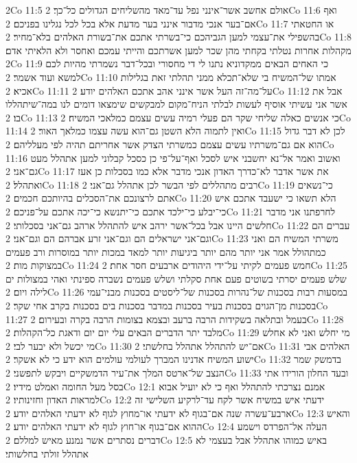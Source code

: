 2Co 11:5  אולם אחשב אשר־אינני נפל עד־מאד מהשליחים הגדולים כל־כך׃
2Co 11:6  ואף אם־בער אנכי מדבור אינני בער מדעת אלא בכל לכל נגלינו בפניכם׃
2Co 11:7  או החטאתי בהשפילי את־עצמי למען הגביהכם כי־בשרתי אתכם את־בשורת האלהים בלא־מחיר׃
2Co 11:8  מקהלות אחרות נטלתי בקחתי מהן שכר למען אשרתכם והייתי עמכם ואחסר ולא הלאיתי אדם׃
2Co 11:9  כי האחים הבאים ממקדוניא נתנו לי די מחסורי ובכל־דבר נשמרתי מהיות לכם למשא ועוד אשמר׃
2Co 11:10  אמתו של־המשיח בי שלא־תכלא ממני תהלתי זאת בגלילות אכיא׃
2Co 11:11  על־מה־זה העל אשר אינני אהב אתכם האלהים יודע׃
2Co 11:12  אבל את אשר אני עשיתי אוסיף לעשות לבלתי הניח־מקום למבקשים שימצאו דומים לנו במה־שיתהללו בו׃
2Co 11:13  כי אנשים כאלה שליחי שקר הם פעלי רמיה עשים עצמם כמלאכי המשיח׃
2Co 11:14  ואין לתמוה הלא השטן גם־הוא עשה עצמו כמלאך האור׃
2Co 11:15  לכן לא דבר גדול הוא אם גם־משרתיו עשים עצמם כמשרתי הצדק אשר אחריתם תהיה לפי מעלליהם׃
2Co 11:16  ואשוב ואמר אל־נא יחשבני איש לסכל ואף־על־פי כן כסכל קבלוני למען אתהלל מעט גם־אני׃
2Co 11:17  את אשר אדבר לא־כדרך האדון אנכי מדבר אלא כמו בסכלות כן אעז ואתהלל׃
2Co 11:18  רבים מתהללים לפי הבשר לכן אתהלל גם־אני׃
2Co 11:19  כי־נשאים אתם לרצונכם את־הסכלים בהיותכם חכמים׃
2Co 11:20  הלא תשאו כי ישעבד אתכם איש כי־יבלע כי־ילכד אתכם כי־יתנשא כי־יכה אתכם על־פניכם׃
2Co 11:21  לחרפתנו אני מדבר חלשים היינו אבל בכל־אשר ירהב איש להתהלל ארהב גם־אני בסכלותי׃
2Co 11:22  עברים הם וגם־אני ישראלים הם וגם־אני זרע אברהם הם וגם־אני׃
2Co 11:23  משרתי המשיח הם ואני כמתהולל אמר אני יותר מהם יותר ביגיעות יותר למאד במכות יותר במוסרות ורב פעמים במצוקות מות׃
2Co 11:24  חמש פעמים לקיתי על־ידי היהודים ארבעים חסר אחת׃
2Co 11:25  שלש פעמים יסרתי בשוטים פעם אחת סקלתי ושלש פעמים נשברה ספינתי ואהי במצולות ים לילה ויום׃
2Co 11:26  במסעות רבות בסכנות של־נהרות בסכנות של־ליסטים בסכנות מבני־עמי בסכנות מן־הגוים בסכנות בעיר בסכנות במדבר בסכנות בים בסכנות בקרב אחי שקר׃
2Co 11:27  בעמל ובתלאה בשקידות הרבה ברעב ובצמא בצומות הרבה בקרה ובעירום׃
2Co 11:28  מלבד יתר הדברים הבאים עלי יום יום ודאגת כל־הקהלות׃
2Co 11:29  מי יחלש ואני לא אחלש מי יכשל ולא יבער לבי׃
2Co 11:30  אם־יש להתהלל אתהלל בחלשתי׃
2Co 11:31  האלהים אבי ישוע המשיח אדנינו המברך לעולמי עולמים הוא ידע כי לא אשקר׃
2Co 11:32  בדמשק שמר הנצב של־ארטס המלך את־עיר הדמשקיים ויבקש לתפשני׃
2Co 11:33  ובעד החלון הורידו אתי בסל מעל החומה ואמלט מידיו׃
2Co 12:1  אמנם נצרכתי להתהלל ואף כי לא יועיל אבוא למראות האדון וחזינותיו׃
2Co 12:2  ידעתי איש במשיח אשר לקח עד־לרקיע השלישי זה ארבע־עשרה שנה אם־בגוף לא ידעתי או־מחוץ לגוף לא ידעתי האלהים יודע׃
2Co 12:3  והאיש ההוא אם־בגוף או־חוץ לגוף לא ידעתי האלהים יודע׃
2Co 12:4  העלה אל־הפרדס וישמע דברים נסתרים אשר נמנע מאיש למללם׃
2Co 12:5  באיש כמוהו אתהלל אבל בעצמי לא אתהלל זולתי בחלשותי׃
